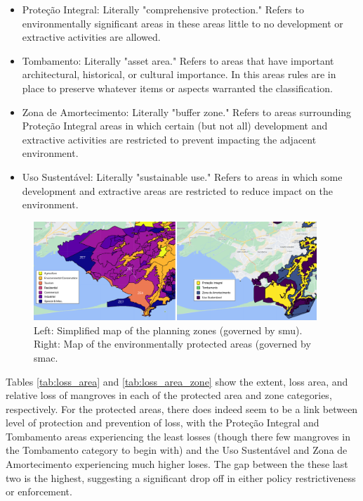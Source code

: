 \begin{itemize}[itemsep=0pt,parsep=0pt]
	\item{Proteção Integral: Literally "comprehensive protection." Refers to environmentally significant areas in these areas little to no development or extractive activities are allowed.}
	\item{Tombamento: Literally "asset area." Refers to areas that have important architectural, historical, or cultural importance. In this areas rules are in place to preserve whatever items or aspects warranted the classification.}
	\item{Zona de Amortecimento: Literally "buffer zone." Refers to areas surrounding Proteção Integral areas in which certain (but not all) development and extractive activities are restricted to prevent impacting the adjacent environment.}
	\item{Uso Sustentável: Literally "sustainable use." Refers to areas in which some development and extractive areas are restricted to reduce impact on the environment.}
\end{itemize}

\begin{figure}[!htb] 
\centering
\includegraphics[width=0.95\textwidth]{Figures/chap4/planning_zones_and_protected_areas.png}
\caption[Planning Zones \& Protected Areas]{Left: Simplified map of the planning zones (governed by \ac{smu}). Right: Map of the environmentally protected areas (governed by \ac{smac}.}
\label{fig:zones}
\end{figure}

Tables \ref{tab:loss_area} and \ref{tab:loss_area_zone} show the extent, loss area, and relative loss of mangroves in each of the protected area and zone categories, respectively. For the protected areas, there does indeed seem to be a link between level of protection and prevention of loss, with the Proteção Integral and Tombamento areas experiencing the least losses (though there few mangroves in the Tombamento category to begin with) and the Uso Sustentável and Zona de Amortecimento experiencing much higher loses. The gap between the these last two is the highest, suggesting a significant drop off in either policy restrictiveness or enforcement.


